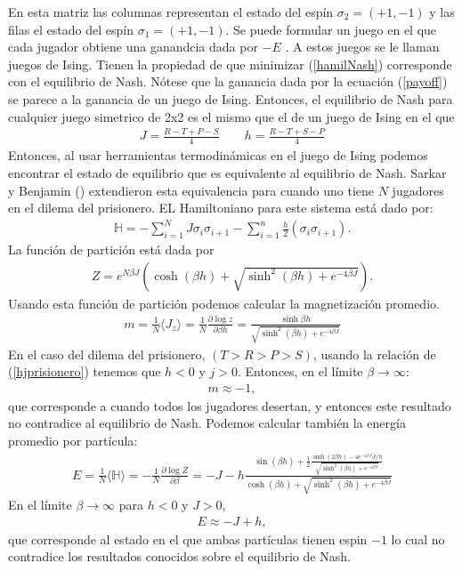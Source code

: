 \documentclass[letterpaper,12pt,oneside]{book}
\begin{document}
%
En esta matriz las columnas representan el estado del esp\'in $\sigma_2 = (+1,-1)$ y las filas el estado del esp\'in $\sigma_1 = (+1, -1)$. Se puede formular un juego en el que cada jugador obtiene una ganandcia dada por $-E$ . A estos juegos se le llaman juegos de Ising. Tienen la propiedad de que minimizar (\ref{hamilNash}) corresponde con el equilibrio de Nash. 
N\'otese que la ganancia dada por la ecuaci\'on (\ref{payoff}) se parece a la ganancia de un juego de Ising. Entonces, el equilibrio de Nash para cualquier juego simetrico de 2x2 es el mismo que el de un juego de Ising en el que
%
\begin{eqnarray}
  J=\frac{R-T+P-S}{4} \qquad h = \frac{R-T+S-P}{4} \label{hjprisionero}
\end{eqnarray}
%
Entonces, al usar herramientas termodin\'amicas en el juego de Ising podemos encontrar el estado de equilibrio que es equivalente al equilibrio de Nash. 
Sarkar y Benjamin (\cite{benjamin}) extendieron esta equivalencia para cuando uno tiene $N$ jugadores en el dilema del prisionero. EL Hamiltoniano para este sistema est\'a dado por: 
%
\begin{eqnarray}
  \mathbb{H} = -\sum_{i=1}^{N} J\sigma_{i} \sigma_{i+1} - \sum_{i=1}^{n}\frac{h}{2} (\sigma_{i} \sigma_{i+1}).
\end{eqnarray}
%
La funci\'on de partici\'on est\'a dada por 
%
\begin{eqnarray}
  Z= e^{N \beta J}(\cosh(\beta h) + \sqrt{\sinh^2(\beta h) + e^{-4 \beta J}}).
\end{eqnarray}
%
Usando esta funci\'on de partici\'on podemos calcular la magnetizaci\'on promedio.
%
\begin{eqnarray}
  m = \frac{1}{N}\langle J_z \rangle = \frac{1}{N}\frac{\partial \log z}{\partial \beta h} = \frac{\sinh \beta h}{\sqrt{\sinh^2(\beta h) +e^{-4 \beta J}}}
\end{eqnarray}
%
En el caso del dilema del prisionero, $(T>R>P>S)$, usando la relaci\'on de (\ref{hjprisionero}) tenemos que $h<0$ y $j>0$. Entonces, en el l\'imite $\beta \to \infty$:
%
\begin{eqnarray}
m \approx -1, \nonumber
\end{eqnarray}
%
que corresponde a cuando todos los jugadores desertan, y entonces este resultado no contradice al equilibrio de Nash.
Podemos calcular tambi\'en la energ\'ia promedio por part\'icula:
%
\begin{eqnarray}
  E = \frac{1}{N} \langle \mathbb{H}\rangle = -\frac{1}{N} \frac{\partial \log Z}{\partial \beta} = -J -h \frac{\sin(\beta h)+ \frac{1}{2}\frac{\sinh(2\beta h) -4e^{-4 \beta J}J/h}{\sqrt{\sinh^2(\beta h)+ e^{-4 \beta J}}}}{\cosh (\beta h) + \sqrt{\sinh^2(\beta h) + e^{-4\beta J}}}
\end{eqnarray}
%
En el l\'imite $\beta \to \infty$ para $h<0$ y $J>0$, 
%
\begin{eqnarray}
  E \approx -J +h,  
\end{eqnarray}
%
que corresponde al estado en el que ambas part\'iculas tienen espin $-1$ lo cual no contradice los resultados conocidos sobre el equilibrio de Nash.
\end{document}
